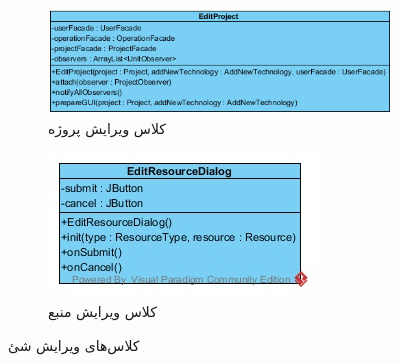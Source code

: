 \begin{figure}[H]
	\centering
	\begin{subfigure}[b]{0.6\textwidth}
		\includegraphics[width=\textwidth]{img/class-design/ui/EditProject}
		\caption{کلاس ویرایش پروژه}
	\end{subfigure}
	\begin{subfigure}[b]{0.5\textwidth}
		\includegraphics[width=\textwidth]{img/class-design/ui/EditResourceDialog.jpg}
		\caption{کلاس ویرایش منبع}
	\end{subfigure}
	\caption{کلاس‌های ویرایش شئ}
\end{figure}

